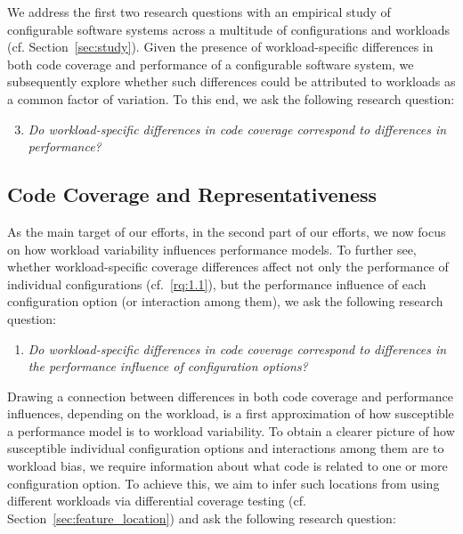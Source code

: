 We address the first two research questions with an empirical study of configurable software systems across a multitude of configurations and workloads (cf. Section~\ref{sec:study}). Given the presence of workload-specific differences in both code coverage and performance of a configurable software system, we subsequently explore whether such differences could be attributed to workloads as a common factor of variation. To this end, we ask the following research question:

\begin{enumerate}[align=left,label=RQ1.\arabic*]
	\setcounter{enumi}{2}
	\item\textit{Do workload-specific differences in code coverage correspond to differences in performance?}\label{rq:1.3}
\end{enumerate}


\subsection{Code Coverage and Representativeness}
As the main target of our efforts, in the second part of our efforts, we now focus on how workload variability influences performance models. To further see, whether workload-specific coverage differences affect not only the performance of individual configurations (cf.~\ref{rq:1.1}), but the performance influence of each configuration option (or interaction among them), we ask the following research question:

\begin{enumerate}[align=left,label=RQ2.\arabic*]
	\item\textit{Do workload-specific differences in code coverage correspond to differences in the performance influence of configuration options?}\label{rq:2.1}
\end{enumerate}

Drawing a connection between differences in both code coverage and performance influences, depending on the workload, is a first approximation of how susceptible a performance model is to workload variability. To obtain a clearer picture of how susceptible individual configuration options and interactions among them are to workload bias, we require information about what code is related to one or more configuration option. To achieve this, we aim to infer such locations from using different workloads via differential coverage testing (cf. Section~\ref{sec:feature_location}) and ask the following research question:

